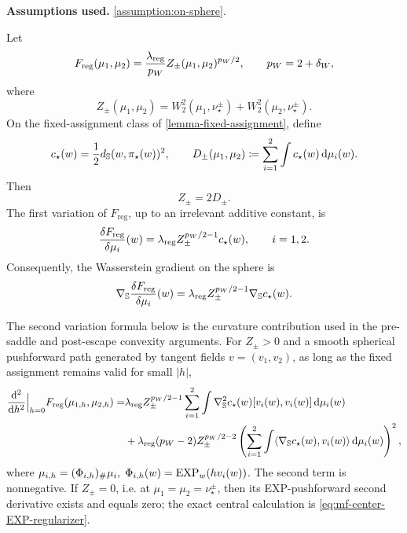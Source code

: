 \begin{lemma}
\label{lem:first-variation-flat-antipodal-potential}
\textbf{Assumptions used.} \cref{assumption:on-sphere}.

Let
\[
    F_{\mathrm{reg}}(\mu_1,\mu_2)
    =
    \frac{\lambda_{\mathrm{reg}}}{p_W}Z_\pm(\mu_1,\mu_2)^{p_W/2},
    \qquad
    p_W=2+\delta_W,
\]
where
\[
    Z_\pm(\mu_1,\mu_2)
    =
    W_2^2(\mu_1,\nu_\star^\pm)+W_2^2(\mu_2,\nu_\star^\pm).
\]
On the fixed-assignment class of \cref{lemma-fixed-assignment}, define
\[
    c_\star(w)=\frac12d_{\mathbb{S}}(w,\pi_\star(w))^2,
    \qquad
    D_\pm(\mu_1,
    \mu_2)
    \coloneq
    \sum_{i=1}^2\int c_\star(w)\,\dd\mu_i(w).
\]
Then
\[
    Z_\pm=2D_\pm.
\]
The first variation of \(F_{\mathrm{reg}}\), up to an irrelevant additive constant, is
\begin{equation}
\label{eq:first-variation-W2-dirac-metric-regularizer}
    \frac{\delta F_{\mathrm{reg}}}{\delta\mu_i}(w)
    =
    \lambda_{\mathrm{reg}} Z_\pm^{p_W/2-1}c_\star(w),
    \qquad
    i=1,2.
\end{equation}
Consequently, the Wasserstein gradient on the sphere is
\begin{equation}
\label{eq:W2-dirac-metric-gradient}
    \nabla_{\mathbb{S}}\frac{\delta F_{\mathrm{reg}}}{\delta\mu_i}(w)
    =
    \lambda_{\mathrm{reg}} Z_\pm^{p_W/2-1}\nabla_{\mathbb{S}} c_\star(w).
\end{equation}

The second variation formula below is the curvature contribution used in the
pre-saddle and post-escape convexity arguments.
For \(Z_\pm>0\) and a smooth spherical pushforward path generated by tangent
fields \(v=(v_1,v_2)\), as long as the fixed assignment remains valid for small \(|h|\),
\begin{align}
\label{eq:second-variation-W2-dirac-metric-regularizer}
    \frac{\dd^2}{\dd h^2}\Big|_{h=0}
    F_{\mathrm{reg}}(\mu_{1,h},\mu_{2,h})
    =&
    \lambda_{\mathrm{reg}} Z_\pm^{p_W/2-1}
    \sum_{i=1}^2
    \int
        \nabla_{\mathbb{S}}^2c_\star(w)[v_i(w),v_i(w)]
    \,\dd\mu_i(w)
    \\
    &+
    \lambda_{\mathrm{reg}}(p_W-2)Z_\pm^{p_W/2-2}
    \left(
        \sum_{i=1}^2
        \int
            \langle\nabla_{\mathbb{S}} c_\star(w),v_i(w)\rangle
        \,\dd\mu_i(w)
    \right)^2,
\end{align}
where $\mu_{i,h}=(\Phi_{i,h})_\#\mu_i,\;
    \Phi_{i,h}(w)=\mathrm{EXP}_w(hv_i(w))$.
The second term is nonnegative.  If \(Z_\pm=0\), i.e. at
\(\mu_1=\mu_2=\nu_\star^\pm\), then its EXP-pushforward second derivative exists and equals zero;
the exact central calculation is \eqref{eq:mf-center-EXP-regularizer}.
\end{lemma}

